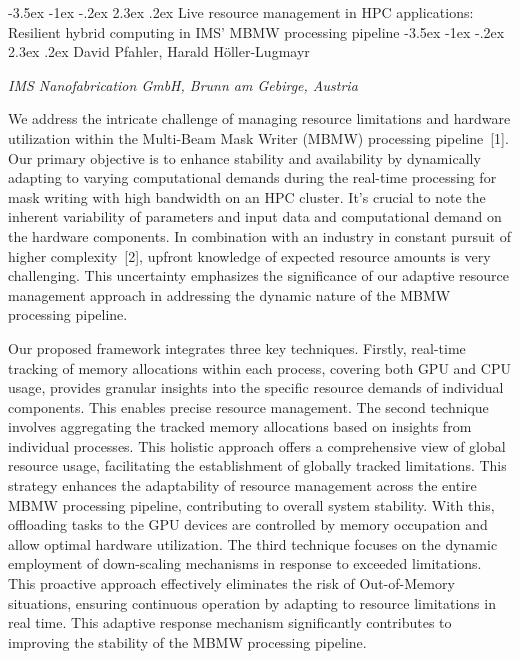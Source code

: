 \documentclass[a4paper, 11pt]{article}
\makeatletter
\newcommand{\affiliation}[1]{\small{\emph{#1}}}
\renewcommand\section{\@startsection {section}{1}{\z@}%
  {-3.5ex \@plus -1ex \@minus -.2ex}%
  {2.3ex \@plus.2ex}%
  {\centering\normalfont\Large\bfseries}}
\renewcommand\subsection{\@startsection {subsection}{1}{\z@}%
  {-3.5ex \@plus -1ex \@minus -.2ex}%
  {2.3ex \@plus.2ex}%
  {\centering\normalfont\large\bfseries}}
\makeatother
\begin{document}
\section{Live resource management in HPC applications:\\ Resilient hybrid computing in IMS' MBMW processing pipeline}
\subsection{David Pfahler, Harald Höller-Lugmayr}

\begin{center}
\setlength{\parskip}{0pt}
\affiliation{IMS Nanofabrication GmbH, Brunn am Gebirge, Austria}
\setlength{\parskip}{7pt}
\end{center}

We address the intricate challenge of managing resource limitations and hardware utilization 
within the Multi-Beam Mask Writer (MBMW) processing pipeline~[1].
Our primary objective is to enhance stability and availability by dynamically adapting to varying computational demands during the real-time processing for mask writing with high bandwidth on an HPC cluster.
It's crucial to note the inherent variability of parameters and input data and computational demand on the hardware components. In combination with an industry in constant pursuit of higher complexity~[2], upfront knowledge of expected resource amounts is very challenging. This uncertainty emphasizes the significance of our adaptive resource management approach in addressing the dynamic nature of the MBMW processing pipeline.

Our proposed framework integrates three key techniques.
Firstly, real-time tracking of memory allocations within each process, covering both GPU and CPU usage, provides granular insights into the specific resource demands of individual components.
This enables precise resource management. 
The second technique involves aggregating the tracked memory allocations based on insights from individual processes.
This holistic approach offers a comprehensive view of global resource usage, facilitating the establishment of globally tracked limitations.
This strategy enhances the adaptability of resource management across the entire MBMW processing pipeline, contributing to overall system stability.
With this, offloading tasks to the GPU devices are controlled by memory occupation and allow optimal hardware utilization.  
The third technique focuses on the dynamic employment of down-scaling mechanisms in response to exceeded limitations.
This proactive approach effectively eliminates the risk of Out-of-Memory situations, ensuring continuous operation by adapting to resource limitations in real time.
This adaptive response mechanism significantly contributes to improving the stability of the MBMW processing pipeline.
\end{document}
